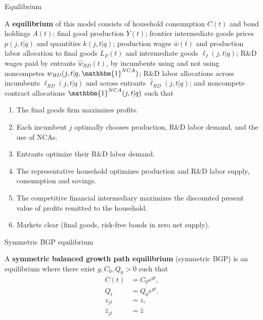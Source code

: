 \documentclass[english,usenames,dvipsnames]{beamer}
\begin{document}
\begin{frame}{Equilibrium}\label{definition:equilibrium}
	\hyperlink{model:firm_ownership}{}
\begin{definition}
	\tiny
	A \textbf{equilibrium} of this model consists of household consumption $C(t)$ and bond holdings $A(t)$; final good production $Y(t)$; frontier intermediate goods prices $p(j,t|q)$ and quantities $k(j,t|q)$; production wages $\bar{w}(t)$ and production labor allocation to final goods $L_{F}(t)$ and intermediate goods $\ell_I(j,t|q)$; R\&D wages paid by entrants $\hat{w}_{RD}(t)$, by incumbents using and not using noncompetes $w_{RD}(j,t|q,\mathbbm{1}^{NCA})$; R\&D labor allocations across incumbents $\ell_{RD}(j,t|q)$ and across entrants $\hat{\ell}_{RD}(j,t|q)$; and noncompete contract allocations $\mathbbm{1}^{NCA}(j,t|q)$ such that 
	\begin{enumerate}
		\item The final goods firm maximizes profits.
		\item Each incumbent $j$ optimally chooses production, R\&D labor demand, and the use of NCAs.
		\item Entrants optimize their R\&D labor demand.
		\item The representative household optimizes production and R\&D labor supply, consumption and savings.
		\item The competitive financial intermediary maximizes the discounted present value of profits remitted to the household.
		\item Markets clear (final goods, risk-free bonds in zero net supply).
	\end{enumerate}
\end{definition}
\end{frame}

\begin{frame}{Symmetric BGP equilibrium}\label{definition:symmetric_bgp}
	\hyperlink{characterizing_BGP}{}
	\begin{definition}
	A \textbf{symmetric balanced growth path equilibrium} (symmetric BGP) is an equilibrium where there exist $g, C_0, Q_0 > 0$ such that
	\begin{align*}
		C(t) &= C_0 e^{gt}, \\
		Q_t &= Q_0 e^{gt}. \\
		z_{jt} &= z, \\
		\hat{z}_{jt} &= \hat{z}
	\end{align*}
	\end{definition}
\end{frame}
\end{document}
